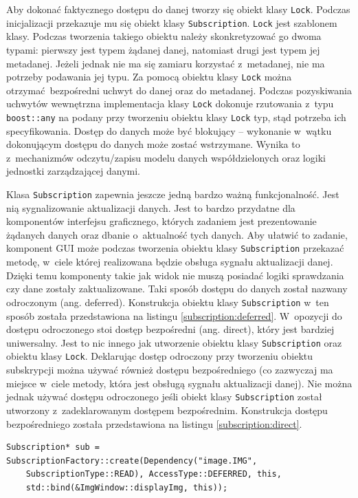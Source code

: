 Aby dokonać faktycznego dostępu do danej tworzy się obiekt klasy \lstinline$Lock$. Podczas inicjalizacji przekazuje mu się obiekt klasy \lstinline$Subscription$. \lstinline$Lock$ jest szablonem klasy. Podczas tworzenia takiego obiektu należy skonkretyzować go dwoma typami: pierwszy jest typem żądanej danej, natomiast drugi jest typem jej metadanej. Jeżeli jednak nie ma się zamiaru korzystać z~metadanej, nie ma potrzeby podawania jej typu. Za pomocą obiektu klasy \lstinline$Lock$ można otrzymać bezpośredni uchwyt do danej oraz do metadanej. Podczas pozyskiwania uchwytów wewnętrzna implementacja klasy \lstinline$Lock$ dokonuje rzutowania z~typu \lstinline$boost::any$ na podany przy tworzeniu obiektu klasy \lstinline$Lock$ typ, stąd potrzeba ich specyfikowania. Dostęp do danych może być blokujący -- wykonanie w~wątku dokonującym dostępu do danych może zostać wstrzymane. Wynika to z~mechanizmów odczytu/zapisu modelu danych współdzielonych oraz logiki jednostki zarządzającej danymi.

Klasa \lstinline$Subscription$ zapewnia jeszcze jedną bardzo ważną funkcjonalność. Jest nią sygnalizowanie aktualizacji danych. Jest to bardzo przydatne dla komponentów interfejsu graficznego, których zadaniem jest prezentowanie żądanych danych oraz dbanie o~aktualność tych danych. Aby ułatwić to zadanie, komponent GUI może podczas tworzenia obiektu klasy \lstinline$Subscription$ przekazać metodę, w~ciele której realizowana będzie obsługa sygnału aktualizacji danej. Dzięki temu komponenty takie jak widok nie muszą posiadać logiki sprawdzania czy dane zostały zaktualizowane. Taki sposób dostępu do danych został nazwany odroczonym (ang. deferred). Konstrukcja obiektu klasy \lstinline$Subscription$ w~ten sposób została przedstawiona na listingu \ref{subscription:deferred}. W~opozycji do dostępu odroczonego stoi dostęp bezpośredni (ang. direct), który jest bardziej uniwersalny. Jest to nic innego jak utworzenie obiektu klasy \lstinline$Subscription$ oraz obiektu klasy \lstinline$Lock$. Deklarując dostęp odroczony przy tworzeniu obiektu subskrypcji można używać również dostępu bezpośredniego (co zazwyczaj ma miejsce w~ciele metody, która jest obsługą sygnału aktualizacji danej). Nie można jednak używać dostępu odroczonego jeśli obiekt klasy \lstinline$Subscription$ został utworzony z~zadeklarowanym dostępem bezpośrednim. Konstrukcja dostępu bezpośredniego została przedstawiona na listingu \ref{subscription:direct}.

\begin{minipage}{\textwidth}
	\begin{lstlisting}[label=subscription:deferred, caption={Przykład tworzenia obiektu klasy \lstinline$Subscription$ z~odroczonym dostępem do danych.},alsoletter={()[].=}]	
Subscription* sub = SubscriptionFactory::create(Dependency("image.IMG",
	SubscriptionType::READ), AccessType::DEFERRED, this,
	std::bind(&ImgWindow::displayImg, this));
	
	
	\end{lstlisting}
\end{minipage}

